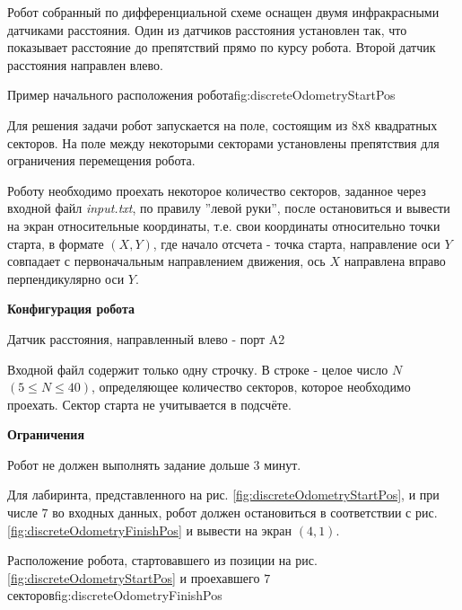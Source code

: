 
Робот собранный по дифференциальной схеме оснащен двумя инфракрасными датчиками расстояния. Один из датчиков расстояния установлен так, что показывает расстояние до препятствий прямо по курсу робота. Второй датчик расстояния направлен влево.

{Пример начального расположения робота}{fig:discreteOdometryStartPos}

Для решения задачи робот запускается на поле, состоящим из 8х8 квадратных секторов. На поле между некоторыми секторами установлены препятствия для ограничения перемещения робота.

Роботу необходимо проехать некоторое количество секторов, заданное через входной файл \textit{input.txt}, по правилу ''левой руки'', после остановиться и вывести на экран относительные координаты, т.е. свои координаты относительно точки старта, в формате $(X, Y)$, где начало отсчета - точка старта, направление оси $Y$ совпадает с первоначальным направлением движения, ось $X$ направлена вправо перпендикулярно оси $Y$.

\begin{center}
\noindent
\textbf{Конфигурация робота}
\end{center}

{Датчик расстояния, направленный влево - порт A2}


Входной файл содержит только одну строчку. В строке - целое число $N$ $(5 \leq N \leq 40)$, определяющее количество секторов, которое необходимо проехать. Сектор старта не учитывается в подсчёте.

\begin{center}
\noindent
\textbf{Ограничения}
\end{center}

Робот не должен выполнять задание дольше 3 минут.

\exampleSection

Для лабиринта, представленного на рис. \ref{fig:discreteOdometryStartPos}, и при числе $7$ во входных данных, робот должен остановиться в соответствии с рис. \ref{fig:discreteOdometryFinishPos} и вывести на экран $(4,1)$.

{Расположение робота, стартовавшего из позиции на рис. \ref{fig:discreteOdometryStartPos} и проехавшего $7$ секторов}{fig:discreteOdometryFinishPos}

